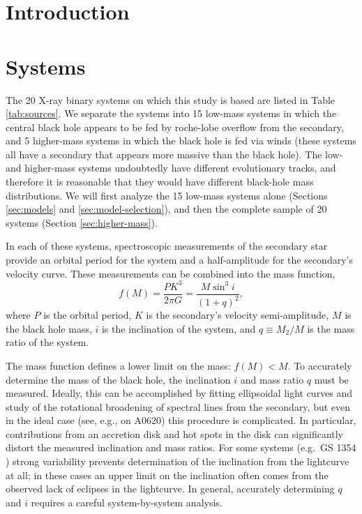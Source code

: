 \documentclass[preprint]{aastex}
\begin{document}
\maketitle

\section{Introduction}
\label{sec:intro}

\section{Systems}
\label{sec:systems}

The 20 X-ray binary systems on which this study is based are listed in
Table \ref{tab:sources}.  We separate the systems into 15 low-mass
systems in which the central black hole appears to be fed by
roche-lobe overflow from the secondary, and 5 higher-mass systems in
which the black hole is fed via winds (these systems all have a
secondary that appears more massive than the black hole).  The low-
and higher-mass systems undoubtedly have different evolutionary
tracks, and therefore it is reasonable that they would have different
black-hole mass distributions.  We will first analyze the 15 low-mass
systems alone (Sections \ref{sec:models} and
\ref{sec:model-selection}), and then the complete sample of 20 systems
(Section \ref{sec:higher-mass}).

In each of these systems, spectroscopic measurements of the secondary
star provide an orbital period for the system and a half-amplitude for
the secondary's velocity curve.  These measurements can be combined
into the mass function,
\begin{equation}
  \label{eq:mass-function}
  f(M) = \frac{P K^3}{2\pi G} = \frac{M \sin^3 i}{\left( 1 + q \right)^2},
\end{equation}
where $P$ is the orbital period, $K$ is the secondary's velocity
semi-amplitude, $M$ is the black hole mass, $i$ is the inclination of
the system, and $q \equiv M_2 / M$ is the mass ratio of the system.

The mass function defines a lower limit on the mass: $f(M) < M$.  To
accurately determine the mass of the black hole, the inclination $i$
and mass ratio $q$ must be measured.  Ideally, this can be
accomplished by fitting ellipsoidal light curves and study of the
rotational broadening of spectral lines from the secondary, but even
in the ideal case (see, e.g., \citet{Cantrell2010} on A0620) this
procedure is complicated.  In particular, contributions from an
accretion disk and hot spots in the disk can significantly distort the
measured inclination and mass ratios.  For some systems (e.g.\ GS 1354
\citep{Casares2009}) strong variability prevents determination of the
inclination from the lightcurve at all; in these cases an upper limit
on the inclination often comes from the observed lack of eclipses in
the lightcurve.  In general, accurately determining $q$ and $i$
requires a careful system-by-system analysis.
\end{document}
